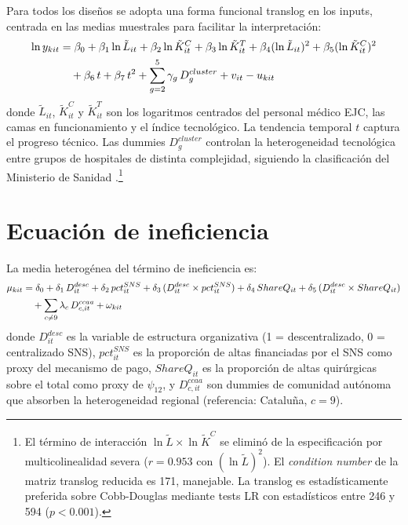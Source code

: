 \documentclass[12pt, a4paper, twoside, openright]{book}
\theoremstyle{plain}
\theoremstyle{definition}
\theoremstyle{remark}
\begin{document}
Para todos los diseños se adopta una forma funcional translog en los inputs, centrada en las medias muestrales para facilitar la interpretación:
\begin{align}
  \ln y_{kit} &= \beta_0
    + \beta_1 \ln\tilde{L}_{it}
    + \beta_2 \ln\tilde{K}^C_{it}
    + \beta_3 \ln\tilde{K}^T_{it}
    + \beta_4 (\ln\tilde{L}_{it})^2
    + \beta_5 (\ln\tilde{K}^C_{it})^2
    \notag \\
    &\quad
    + \beta_6\, t
    + \beta_7\, t^2
    + \sum_{g=2}^{5} \gamma_g\, D^{cluster}_g
    + v_{it} - u_{kit}
  \label{eq:frontera_tl}
\end{align}
donde $\tilde{L}_{it}$, $\tilde{K}^C_{it}$ y $\tilde{K}^T_{it}$ son los logaritmos centrados del personal médico EJC, las camas en funcionamiento y el índice tecnológico. La tendencia temporal $t$ captura el progreso técnico. Las dummies $D^{cluster}_g$ controlan la heterogeneidad tecnológica entre grupos de hospitales de distinta complejidad, siguiendo la clasificación del Ministerio de Sanidad \citep{ministerio2007}.\footnote{El término de interacción $\ln\tilde{L}\times\ln\tilde{K}^C$ se eliminó de la especificación por multicolinealidad severa ($r=0.953$ con $(\ln\tilde{L})^2$). El \textit{condition number} de la matriz translog reducida es 171, manejable. La translog es estadísticamente preferida sobre Cobb-Douglas mediante tests LR con estadísticos entre 246 y 594 ($p<0.001$).}

\section{Ecuación de ineficiencia}
\label{sec:ecuacion_inef}

La media heterogénea del término de ineficiencia es:
\begin{align}
  \mu_{kit} &= \delta_0
    + \delta_1\, D^{desc}_{it}
    + \delta_2\, pct^{SNS}_{it}
    + \delta_3\, (D^{desc}_{it} \times pct^{SNS}_{it})
    + \delta_4\, ShareQ_{it}
    + \delta_5\, (D^{desc}_{it} \times ShareQ_{it})
    \notag \\
    &\quad + \sum_{c \neq 9} \lambda_c\, D^{ccaa}_{c,it}
    + \omega_{kit}
  \label{eq:uhet}
\end{align}
donde $D^{desc}_{it}$ es la variable de estructura organizativa (1 = descentralizado, 0 = centralizado SNS), $pct^{SNS}_{it}$ es la proporción de altas financiadas por el SNS como proxy del mecanismo de pago, $ShareQ_{it}$ es la proporción de altas quirúrgicas sobre el total como proxy de $\psi_{12}$, y $D^{ccaa}_{c,it}$ son dummies de comunidad autónoma que absorben la heterogeneidad regional (referencia: Cataluña, $c=9$).
\end{document}
